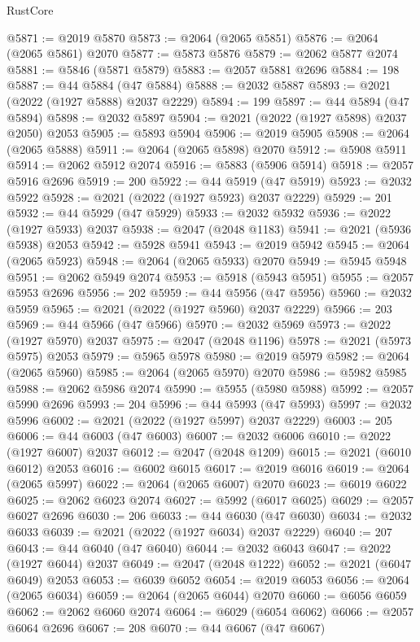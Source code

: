 \begin{lexlean}{RustCore}
\begin{coremodule}
@5871 := @2019 @5870
@5873 := @2064 (@2065 @5851)
@5876 := @2064 (@2065 @5861) @2070
@5877 := @5873 @5876
@5879 := @2062 @5877 @2074
@5881 := @5846 (@5871 @5879)
@5883 := @2057 @5881 @2696
@5884 := 198
@5887 := @44 @5884 (@47 @5884)
@5888 := @2032 @5887
@5893 := @2021 (@2022 (@1927 @5888) @2037 @2229)
@5894 := 199
@5897 := @44 @5894 (@47 @5894)
@5898 := @2032 @5897
@5904 := @2021 (@2022 (@1927 @5898) @2037 @2050) @2053
@5905 := @5893 @5904
@5906 := @2019 @5905
@5908 := @2064 (@2065 @5888)
@5911 := @2064 (@2065 @5898) @2070
@5912 := @5908 @5911
@5914 := @2062 @5912 @2074
@5916 := @5883 (@5906 @5914)
@5918 := @2057 @5916 @2696
@5919 := 200
@5922 := @44 @5919 (@47 @5919)
@5923 := @2032 @5922
@5928 := @2021 (@2022 (@1927 @5923) @2037 @2229)
@5929 := 201
@5932 := @44 @5929 (@47 @5929)
@5933 := @2032 @5932
@5936 := @2022 (@1927 @5933) @2037
@5938 := @2047 (@2048 @1183)
@5941 := @2021 (@5936 @5938) @2053
@5942 := @5928 @5941
@5943 := @2019 @5942
@5945 := @2064 (@2065 @5923)
@5948 := @2064 (@2065 @5933) @2070
@5949 := @5945 @5948
@5951 := @2062 @5949 @2074
@5953 := @5918 (@5943 @5951)
@5955 := @2057 @5953 @2696
@5956 := 202
@5959 := @44 @5956 (@47 @5956)
@5960 := @2032 @5959
@5965 := @2021 (@2022 (@1927 @5960) @2037 @2229)
@5966 := 203
@5969 := @44 @5966 (@47 @5966)
@5970 := @2032 @5969
@5973 := @2022 (@1927 @5970) @2037
@5975 := @2047 (@2048 @1196)
@5978 := @2021 (@5973 @5975) @2053
@5979 := @5965 @5978
@5980 := @2019 @5979
@5982 := @2064 (@2065 @5960)
@5985 := @2064 (@2065 @5970) @2070
@5986 := @5982 @5985
@5988 := @2062 @5986 @2074
@5990 := @5955 (@5980 @5988)
@5992 := @2057 @5990 @2696
@5993 := 204
@5996 := @44 @5993 (@47 @5993)
@5997 := @2032 @5996
@6002 := @2021 (@2022 (@1927 @5997) @2037 @2229)
@6003 := 205
@6006 := @44 @6003 (@47 @6003)
@6007 := @2032 @6006
@6010 := @2022 (@1927 @6007) @2037
@6012 := @2047 (@2048 @1209)
@6015 := @2021 (@6010 @6012) @2053
@6016 := @6002 @6015
@6017 := @2019 @6016
@6019 := @2064 (@2065 @5997)
@6022 := @2064 (@2065 @6007) @2070
@6023 := @6019 @6022
@6025 := @2062 @6023 @2074
@6027 := @5992 (@6017 @6025)
@6029 := @2057 @6027 @2696
@6030 := 206
@6033 := @44 @6030 (@47 @6030)
@6034 := @2032 @6033
@6039 := @2021 (@2022 (@1927 @6034) @2037 @2229)
@6040 := 207
@6043 := @44 @6040 (@47 @6040)
@6044 := @2032 @6043
@6047 := @2022 (@1927 @6044) @2037
@6049 := @2047 (@2048 @1222)
@6052 := @2021 (@6047 @6049) @2053
@6053 := @6039 @6052
@6054 := @2019 @6053
@6056 := @2064 (@2065 @6034)
@6059 := @2064 (@2065 @6044) @2070
@6060 := @6056 @6059
@6062 := @2062 @6060 @2074
@6064 := @6029 (@6054 @6062)
@6066 := @2057 @6064 @2696
@6067 := 208
@6070 := @44 @6067 (@47 @6067)

\end{coremodule}
\end{lexlean}

